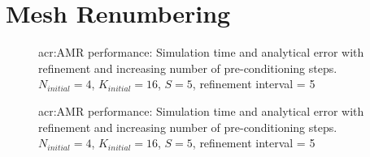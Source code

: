 \chapter{Mesh Renumbering}\label{chapter:renumbering}

\begin{figure}[H]
	\centering
	\caption{\Acrlong{acr:AMR} performance: Simulation time and analytical error with refinement and increasing number of pre-conditioning steps. \(N_{initial} = 4\), \(K_{initial} = 16\), \(S = 5\), refinement interval = 5}\label{fig:mesh_P0_before_adaptivity1}
\end{figure}

\begin{figure}[H]
	\centering
	\caption{\Acrlong{acr:AMR} performance: Simulation time and analytical error with refinement and increasing number of pre-conditioning steps. \(N_{initial} = 4\), \(K_{initial} = 16\), \(S = 5\), refinement interval = 5}\label{fig:mesh_P0_after_adaptivity1}
\end{figure}
